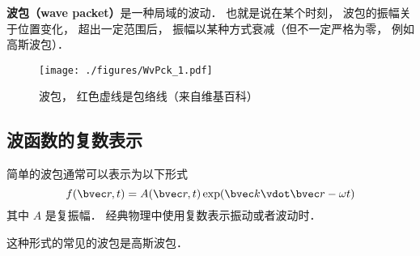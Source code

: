 
\textbf{波包（wave packet）}是一种局域的波动． 也就是说在某个时刻， 波包的振幅关于位置变化， 超出一定范围后， 振幅以某种方式衰减（但不一定严格为零， 例如高斯波包）． %

\begin{figure}[ht]
\centering
\texttt{[image: ./figures/WvPck\_1.pdf]}
\caption{波包， 红色虚线是包络线（来自维基百科）} \label{WvPck_fig1}
\end{figure}

\subsection{波函数的复数表示}
简单的波包通常可以表示为以下形式
\begin{equation}
f(\bvec r, t) = A(\bvec r, t) \exp(\bvec k \vdot \bvec r - \omega t)
\end{equation}
其中 $A$ 是复振幅． 经典物理中使用复数表示振动或者波动时．

这种形式的常见的波包是高斯波包．
